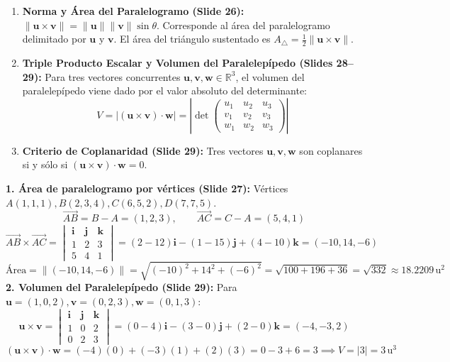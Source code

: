 \documentclass[10pt,letterpaper]{article}
\newcommand{\iu}{\mathbf{i}}
\newcommand{\ju}{\mathbf{j}}
\newcommand{\ku}{\mathbf{k}}
\newcommand{\vu}{\mathbf{u}}
\newcommand{\vv}{\mathbf{v}}
\newcommand{\vw}{\mathbf{w}}
\begin{document}
\begin{cajaTeorema}
\begin{enumerate}
    \item \textbf{Norma y Área del Paralelogramo (Slide 26):} $\|\vu \times \vv\| = \|\vu\|\|\vv\|\sin\theta$. Corresponde al área del paralelogramo delimitado por $\vu$ y $\vv$. El área del triángulo sustentado es $A_{\triangle} = \frac{1}{2}\|\vu \times \vv\|$.
    \item \textbf{Triple Producto Escalar y Volumen del Paralelepípedo (Slides 28--29):} Para tres vectores concurrentes $\vu, \vv, \vw \in \mathbb{R}^3$, el volumen del paralelepípedo viene dado por el valor absoluto del determinante:
    \[
    V = |(\vu \times \vv) \cdot \vw| = \left| \det \begin{pmatrix} u_1 & u_2 & u_3 \\ v_1 & v_2 & v_3 \\ w_1 & w_2 & w_3 \end{pmatrix} \right|
    \]
    \item \textbf{Criterio de Coplanaridad (Slide 29):} Tres vectores $\vu, \vv, \vw$ son coplanares si y sólo si $(\vu \times \vv) \cdot \vw = 0$.
\end{enumerate}
\end{cajaTeorema}

\begin{cajaEjemplo}
\textbf{1. Área de paralelogramo por vértices (Slide 27):} Vértices $A(1,1,1), B(2,3,4), C(6,5,2), D(7,7,5)$.
\[
\overrightarrow{AB} = B - A = (1, 2, 3), \qquad \overrightarrow{AC} = C - A = (5, 4, 1)
\]
\[
\overrightarrow{AB} \times \overrightarrow{AC} = \begin{vmatrix} \iu & \ju & \ku \\ 1 & 2 & 3 \\ 5 & 4 & 1 \end{vmatrix} = (2-12)\iu - (1-15)\ju + (4-10)\ku = (-10, 14, -6)
\]
\[
\text{Área} = \|(-10, 14, -6)\| = \sqrt{(-10)^2 + 14^2 + (-6)^2} = \sqrt{100 + 196 + 36} = \sqrt{332} \approx 18.2209\,\text{u}^2
\]
\textbf{2. Volumen del Paralelepípedo (Slide 29):} Para $\vu = (1, 0, 2), \vv = (0, 2, 3), \vw = (0, 1, 3)$:
\[
\vu \times \vv = \begin{vmatrix} \iu & \ju & \ku \\ 1 & 0 & 2 \\ 0 & 2 & 3 \end{vmatrix} = (0 - 4)\iu - (3 - 0)\ju + (2 - 0)\ku = (-4, -3, 2)
\]
\[
(\vu \times \vv) \cdot \vw = (-4)(0) + (-3)(1) + (2)(3) = 0 - 3 + 6 = 3 \implies V = |3| = 3\,\text{u}^3
\]
\end{cajaEjemplo}
\end{document}
